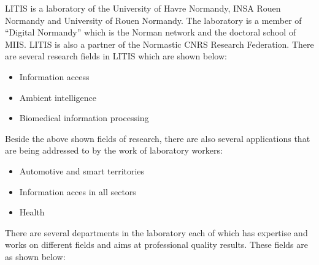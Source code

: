 LITIS is a laboratory of the University of Havre Normandy, INSA Rouen Normandy and University of Rouen 
Normandy. The laboratory is a member of ``Digital Normandy'' which is the Norman network and the 
doctoral school of MIIS. LITIS is also a partner of the Normastic CNRS Research Federation. 
There are several research fields in LITIS which are shown below:

\begin{itemize}
	\item Information access
	\item Ambient intelligence
	\item Biomedical information processing
\end{itemize}

Beside the above shown fields of research, there are also several applications that are being 
addressed to by the work of laboratory workers:

\begin{itemize}
	\item Automotive and smart territories
	\item Information acces in all sectors
	\item Health
\end{itemize}

There are several departments in the laboratory each of which has expertise and works on different 
fields and aims at professional quality results. These fields are as shown below:

